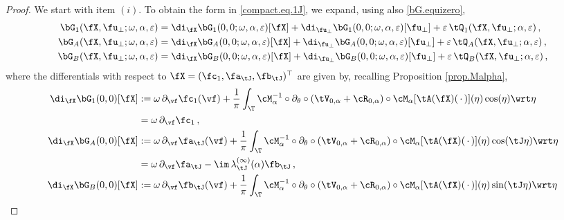 \documentclass[a4paper,reqno,10pt]{article}
\newcommand{\pa}{\partial}
\begin{document}
\begin{proof}
	We start with item $(i)$. To obtain the form in \eqref{compact.eq.1J}, we expand, using also \eqref{bG.equizero},
	\begin{equation}
		\begin{aligned}
			\bG_{1}&(\fX,\fu_{\perp};\omega,\alpha,\varepsilon)= \di_{\fX}\bG_{1}(0,0;\omega,\alpha,\varepsilon)[\fX]+ \di_{\fu_{\perp}}\bG_{1}(0,0;\omega,\alpha,\varepsilon)[\fu_{\perp}]+ \varepsilon \, \tQ_{1} (\fX,\fu_{\perp};\alpha,\varepsilon)  \,,\\
		\bG_{A}&(\fX,\fu_{\perp};\omega,\alpha,\varepsilon)= \di_{\fX}\bG_{A}(0,0;\omega,\alpha,\varepsilon)[\fX]+ \di_{\fu_{\perp}}\bG_{A}(0,0;\omega,\alpha,\varepsilon)[\fu_{\perp}] + \varepsilon \, \tQ_{A} (\fX,\fu_{\perp};\alpha,\varepsilon)  \,,\\
		\bG_{B}&(\fX,\fu_{\perp};\omega,\alpha,\varepsilon)= \di_{\fX}\bG_{B}(0,0;\omega,\alpha,\varepsilon)[\fX]+ \di_{\fu_{\perp}}\bG_{B}(0,0;\omega,\alpha,\varepsilon)[\fu_{\perp}] + \varepsilon \, \tQ_{B} (\fX,\fu_{\perp};\alpha,\varepsilon)  \,,
		\end{aligned}
	\end{equation}
	where the differentials  with respect to $\fX=(\fc_{1},\fa_{\tJ},\fb_{\tJ})^{\top}$ are given by, recalling Proposition \ref{prop.Malpha},
	\begin{equation}
				\begin{aligned}
				\di_{\fX}\bG_{1}(0,0)[\fX]& := \omega\,\pa_{\vf}\fc_{1}(\vf) 
				+  \frac{1}{\pi}\int_{\T} \cM_{\alpha}^{-1}\circ \pa_{\theta} \circ (\tV_{0,\alpha}+\cR_{0,\alpha}) \circ \cM_{\alpha}[ \tA(\fX)(\,\cdot\,) ](\eta) \cos(\eta) \wrt \eta \\
				& =  \omega\,\pa_{\vf} \fc_{1}\,, \\
				\di_{\fX}\bG_{A}(0,0)[\fX]& :=  \omega\,\pa_{\vf}\fa_{\tJ}(\vf)+ \frac{1}{\pi} \int_{\T} \cM_{\alpha}^{-1}\circ \pa_{\theta} \circ (\tV_{0,\alpha}+\cR_{0,\alpha}) \circ  \cM_{\alpha}[ \tA(\fX)(\,\cdot\,) ] (\eta) \cos(\tJ \eta) \wrt \eta \\
				& = \omega\,\pa_{\vf}\fa_{\tJ}  - \im\, \lambda_{\tJ}^{(\infty)}(\alpha) \fb_{\tJ}  \,, \\
				\di_{\fX}\bG_{B}(0,0)[\fX] &:= \omega\,\pa_{\vf}\fb_{\tJ}(\vf)+  \frac{1}{\pi} \int_{\T} \cM_{\alpha}^{-1}\circ \pa_{\theta} \circ (\tV_{0,\alpha}+\cR_{0,\alpha}) \circ \cM_{\alpha}[ \tA(\fX)(\,\cdot\,) ] (\eta) \sin(\tJ \eta) \wrt \eta\\

\end{aligned}
\end{equation}
\end{proof}
\end{document}
